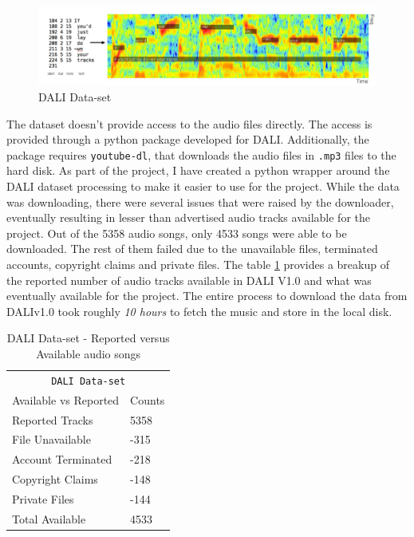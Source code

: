 \begin{figure}
    \centering
    \includegraphics[width=1.0\textwidth]{05-research study/figures/dalidataset.pdf}
    \caption{DALI Data-set}
    \label{fig:dalidataset}
\end{figure}

The dataset doesn't provide access to the audio files directly. The access is provided through a python package developed for DALI. Additionally, the package requires \texttt{youtube-dl}, that downloads the audio files in \texttt{.mp3} files to the hard disk. As part of the project, I have created a python wrapper around the DALI dataset processing to make it easier to use for the project. While the data was downloading, there were several issues that were raised by the downloader, eventually resulting in lesser than advertised audio tracks available for the project. Out of the 5358 audio songs, only 4533 songs were able to be downloaded. The rest of them failed due to the unavailable files, terminated accounts, copyright claims and private files. The 
table \ref{dali-table} provides a breakup of the reported number of audio tracks available in DALI V1.0 and what was eventually available for the project. The entire process to download the data from DALIv1.0 took roughly \textit{10 hours} to fetch the music and store in the local disk.

\renewcommand{\arraystretch}{2}
\setlength{\arrayrulewidth}{0.3mm}
\begin{table}[H]
\small
\begin{center}
\begin{tabular}{ |p{6cm}| p{3cm}| }
\multicolumn{2}{c}{\texttt{DALI Data-set}} \\
\cline{1-2}
 Available vs Reported     & Counts  \\
\hline \hline
 Reported Tracks    & 5358  \\
 File Unavailable   & -315   \\
 Account Terminated & -218   \\
 Copyright Claims   & -148   \\
 Private Files      & -144   \\ 
 \hline \hline
 Total Available    & 4533  \\
 \hline \hline
\end{tabular} 
\caption{\label{dali-table} DALI Data-set - Reported versus Available audio songs}
\end{center}
\end{table}

